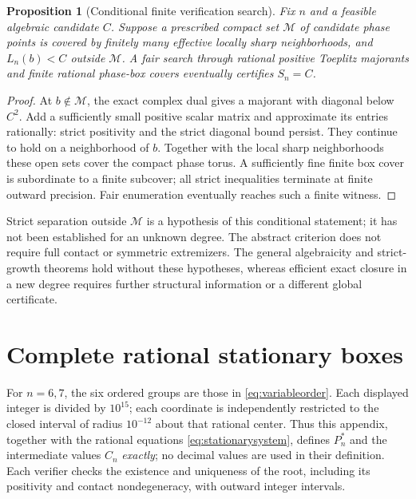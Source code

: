 \documentclass[11pt]{article}
\newtheorem{proposition}[theorem]{Proposition}
\begin{document}
\begin{proposition}[Conditional finite verification search]\label{prop:termination}
Fix $n$ and a feasible algebraic candidate $C$. Suppose a prescribed
compact set $\mathcal M$ of candidate phase points is covered by finitely
many effective locally sharp neighborhoods, and $L_n(b)<C$ outside
$\mathcal M$. A fair search through rational positive Toeplitz
majorants and finite rational phase-box covers eventually certifies
$S_n=C$.
\end{proposition}
\begin{proof}
At $b\notin\mathcal M$, the exact complex dual gives a majorant with
diagonal below $C^2$. Add a sufficiently small positive scalar matrix
and approximate its entries rationally: strict positivity and the strict
diagonal bound persist. They continue to hold on a neighborhood of $b$.
Together with the local sharp neighborhoods these open sets cover the
compact phase torus. A sufficiently fine finite box cover is subordinate
to a finite subcover; all strict inequalities terminate at finite outward
precision. Fair enumeration eventually reaches such a finite witness.
\end{proof}
Strict separation outside $\mathcal M$ is a hypothesis of this
conditional statement; it has not been established for an unknown degree.
The abstract criterion does not require full contact or symmetric
extremizers. The general algebraicity and strict-growth theorems hold
without these hypotheses, whereas efficient exact closure in a new
degree requires further structural information or a different global
certificate.


\appendix


\section{Complete rational stationary boxes}\label{app:rootboxes}

For $n=6,7$, the six ordered groups are those in
\eqref{eq:variableorder}.  Each displayed integer is divided by $10^{15}$;
each coordinate is independently restricted to the closed interval of
radius $10^{-12}$ about that rational center.  Thus this appendix,
together with the rational equations \eqref{eq:stationarysystem}, defines
$P_n^*$ and the intermediate values $C_n$ \emph{exactly}; no decimal values are used in their definition.
Each verifier checks the existence and uniqueness of the root, including
its positivity and contact nondegeneracy, with outward integer intervals.
\end{document}
